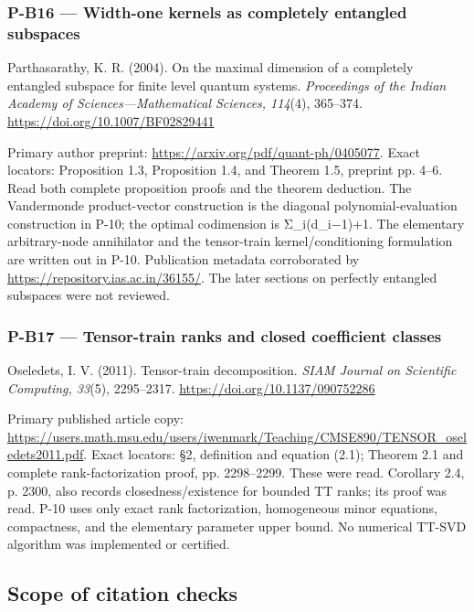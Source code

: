 \documentclass[11pt,a4paper]{article}
\theoremstyle{definition}\newtheorem{definition}{Definition}
\begin{document}
\subsubsection{P-B16 --- Width-one kernels as completely entangled
subspaces}\label{p-b16--width-one-kernels-as-completely-entangled-subspaces}

Parthasarathy, K. R. (2004). On the maximal dimension of a completely
entangled subspace for finite level quantum systems. \emph{Proceedings
of the Indian Academy of Sciences---Mathematical Sciences, 114}(4),
365--374. \url{https://doi.org/10.1007/BF02829441}

Primary author preprint: \url{https://arxiv.org/pdf/quant-ph/0405077}.
Exact locators: Proposition 1.3, Proposition 1.4, and Theorem 1.5,
preprint pp. 4--6. Read both complete proposition proofs and the theorem
deduction. The Vandermonde product-vector construction is the diagonal
polynomial-evaluation construction in P-10; the optimal codimension is
Σ\_i(d\_i−1)+1. The elementary arbitrary-node annihilator and the
tensor-train kernel/conditioning formulation are written out in P-10.
Publication metadata corroborated by
\url{https://repository.ias.ac.in/36155/}. The later sections on
perfectly entangled subspaces were not reviewed.

\subsubsection{P-B17 --- Tensor-train ranks and closed coefficient
classes}\label{p-b17--tensor-train-ranks-and-closed-coefficient-classes}

Oseledets, I. V. (2011). Tensor-train decomposition. \emph{SIAM Journal
on Scientific Computing, 33}(5), 2295--2317.
\url{https://doi.org/10.1137/090752286}

Primary published article copy:
\url{https://users.math.msu.edu/users/iwenmark/Teaching/CMSE890/TENSOR_oseledets2011.pdf}.
Exact locators: §2, definition and equation (2.1); Theorem 2.1 and
complete rank-factorization proof, pp. 2298--2299. These were read.
Corollary 2.4, p. 2300, also records closedness/existence for bounded TT
ranks; its proof was read. P-10 uses only exact rank factorization,
homogeneous minor equations, compactness, and the elementary parameter
upper bound. No numerical TT-SVD algorithm was implemented or certified.

\subsection{Scope of citation checks}\label{scope-of-citation-checks}
\end{document}
